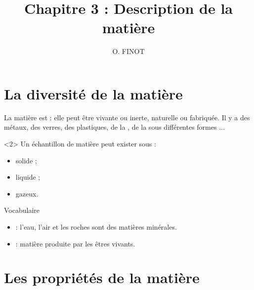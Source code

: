 \documentclass[xcolor={dvipsnames}]{beamer}
\title{Chapitre 3 : Description de la matière}
\author{O. FINOT}\institute{Collège S$^t$ Bernard}
\begin{document}
\begin{frame}
  \titlepage 
\end{frame}


\section{La diversité de la matière}

\begin{frame}




\begin{alertblock}{}
	La matière est  : elle peut être vivante ou inerte, naturelle ou fabriquée. Il y a des métaux, des verres, des plastiques, de la , de la  sous différentes formes ...
\end{alertblock}


\begin{alertblock}<2>{}
	Un échantillon de matière peut exister sous  :
	\begin{itemize}
		\item solide ;
		\item liquide ;
		\item gazeux.
	\end{itemize}
\end{alertblock}

\end{frame}


\begin{frame}

\begin{block}{\Large{Vocabulaire}}
	\begin{itemize}
		\item {} : \pause  l'eau, l'air et les roches sont des matières minérales.\pause
		
		\item {} : \pause matière produite par les êtres vivants.
	\end{itemize}
\end{block}
		
\end{frame}

\section{Les propriétés de la matière}
\end{document}
